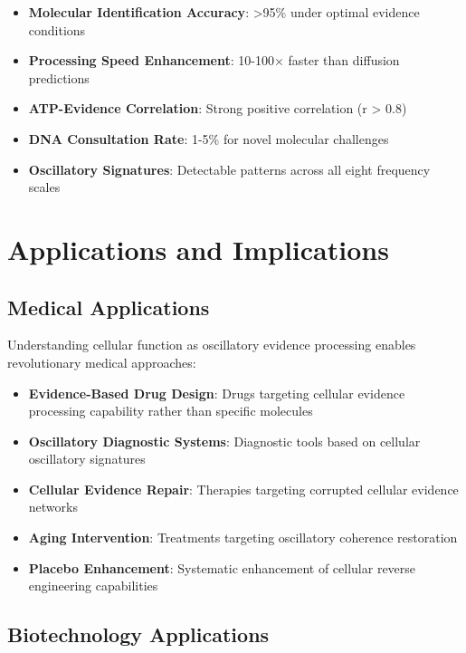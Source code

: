 \documentclass[12pt,a4paper]{article}
\begin{document}
{\begin{itemize}
\item \textbf{Molecular Identification Accuracy}: >95\% under optimal evidence conditions
\item \textbf{Processing Speed Enhancement}: 10-100× faster than diffusion predictions
\item \textbf{ATP-Evidence Correlation}: Strong positive correlation (r > 0.8)
\item \textbf{DNA Consultation Rate}: 1-5\% for novel molecular challenges
\item \textbf{Oscillatory Signatures}: Detectable patterns across all eight frequency scales
\end{itemize}

\section{Applications and Implications}

\subsection{Medical Applications}

Understanding cellular function as oscillatory evidence processing enables revolutionary medical approaches:

\begin{itemize}
\item \textbf{Evidence-Based Drug Design}: Drugs targeting cellular evidence processing capability rather than specific molecules
\item \textbf{Oscillatory Diagnostic Systems}: Diagnostic tools based on cellular oscillatory signatures
\item \textbf{Cellular Evidence Repair}: Therapies targeting corrupted cellular evidence networks
\item \textbf{Aging Intervention}: Treatments targeting oscillatory coherence restoration
\item \textbf{Placebo Enhancement}: Systematic enhancement of cellular reverse engineering capabilities
\end{itemize}

\subsection{Biotechnology Applications}

}
\end{document}
